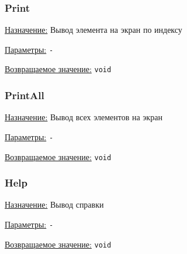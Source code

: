 \subsubsection*{Print}

\underline{Назначение:} Вывод элемента на экран по индексу

\underline{Параметры:} \verb|-|

\underline{Возвращаемое значение:} \verb|void|


\subsubsection*{PrintAll}

\underline{Назначение:} Вывод всех элементов на экран

\underline{Параметры:} \verb|-|

\underline{Возвращаемое значение:} \verb|void|


\subsubsection*{Help}

\underline{Назначение:} Вывод справки

\underline{Параметры:} \verb|-|

\underline{Возвращаемое значение:} \verb|void|